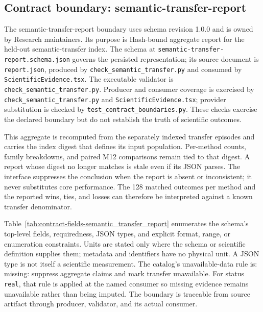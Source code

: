 \subsection{Contract boundary: semantic-transfer-report}\label{sec:contract-semantic_transfer_report}
The semantic-transfer-report boundary uses schema revision 1.0.0 and is owned by Research maintainers. Its purpose is Hash-bound aggregate report for the held-out semantic-transfer index. The schema at \texttt{semantic-transfer-report.schema.json} governs the persisted representation; its source document is \texttt{report.json}, produced by \texttt{check\_\allowbreak{}semantic\_\allowbreak{}transfer.py} and consumed by \texttt{Scientific\allowbreak{}Evidence.tsx}. The executable validator is \texttt{check\_\allowbreak{}semantic\_\allowbreak{}transfer.py}. Producer and consumer coverage is exercised by \texttt{check\_\allowbreak{}semantic\_\allowbreak{}transfer.py} and \texttt{Scientific\allowbreak{}Evidence.tsx}; provider substitution is checked by \texttt{test\_\allowbreak{}contract\_\allowbreak{}boundaries.py}. These checks exercise the declared boundary but do not establish the truth of scientific outcomes.

This aggregate is recomputed from the separately indexed transfer episodes and carries the index digest that defines its input population. Per-method counts, family breakdowns, and paired M12 comparisons remain tied to that digest. A report whose digest no longer matches is stale even if its JSON parses. The interface suppresses the conclusion when the report is absent or inconsistent; it never substitutes core performance. The 128 matched outcomes per method and the reported wins, ties, and losses can therefore be interpreted against a known transfer denominator.

Table~\ref{tab:contract-fields-semantic_transfer_report} enumerates the schema's top-level fields, requiredness, JSON types, and explicit format, range, or enumeration constraints. Units are stated only where the schema or scientific definition supplies them; metadata and identifiers have no physical unit. A JSON type is not itself a scientific measurement. The catalog's unavailable-data rule is: missing: suppress aggregate claims and mark transfer unavailable. For status \texttt{real}, that rule is applied at the named consumer so missing evidence remains unavailable rather than being imputed. The boundary is traceable from source artifact through producer, validator, and its actual consumer.

